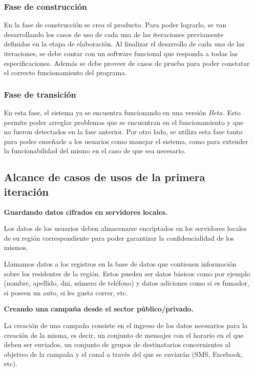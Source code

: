 \documentclass[a4paper, 10pt, twoside]{article}
\begin{document}
\subsubsection{Fase de construcción}
En la fase de construcción se crea el producto. Para poder lograrlo, se van desarrollando los casos de uso de cada una de las iteraciones previamente definidas en la etapa de elaboración. Al finalizar el desarrollo de cada una de las iteraciones, se debe contar con un software funcional que responda a todas las especificaciones. Además se debe proveer de casos de prueba para poder constatar el correcto funcionamiento del programa.

\subsubsection{Fase de transición}
En esta fase, el sistema ya se encuentra funcionando en una versión $Beta$. Esto permite poder arreglar problemas que se encuentran en el funcionamiento y que no fueron detectados en la fase anterior. Por otro lado, se utiliza esta fase tanto para poder enseñarle a los usuarios como manejar el sistema, como para extender la funcionabilidad del mismo en el caso de que sea necesario.

\subsection{Alcance de casos de usos de la primera iteración}
\textbf{Guardando datos cifrados en servidores locales.}

Los datos de los usuarios deben almacenarse encriptados en los servidores locales de su región correspondiente para poder garantizar la confidencialidad de los mismos.

Llamamos datos a los registros en la base de datos que contienen información sobre los residentes de la región. Estos pueden ser datos básicos como por ejemplo (nombre, apellido, dni, número de teléfono) y datos adiciones como si es fumador, si poseen un auto, si les gusta correr, etc.

\textbf{Creando una campaña desde el sector público/privado.}

La creación de una campaña consiste en el ingreso de los datos necesarios para la creación de la misma, es decir, un conjunto de mensajes con el horario en el que deben ser enviados, un conjunto de grupos de destinatarios concernientes al objetivo de la campaña y el canal a través del que se enviarán (SMS, Facebook, etc).
\end{document}
